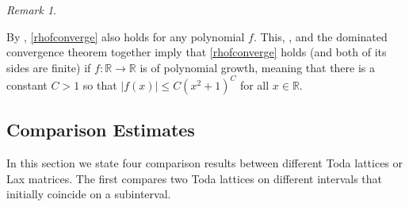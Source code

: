 \documentclass{amsart}
\numberwithin{equation}{section}
\theoremstyle{remark}
\newtheorem{rem}[thm]{Remark}
\theoremstyle{definition}
\begin{document}
	\begin{rem} 
		
		\label{fcn} 
		
		By \cite[Corollary 3.2]{DSME}, \eqref{rhofconverge} also holds for any polynomial $f$. This, , and the dominated convergence theorem together imply that \eqref{rhofconverge} holds (and both of its sides are finite) if $f : \mathbb{R} \rightarrow \mathbb{R}$ is of polynomial growth, meaning that there is a constant $C > 1$ so that $|f(x)| \le C (x^2+1)^C$ for all $x \in \mathbb{R}$.
	\end{rem} 
	
	


	\subsection{Comparison Estimates}

	\label{LCompare} 	
	
	In this section we state four comparison results between different Toda lattices or Lax matrices. The first compares two Toda lattices on different intervals that initially coincide on a subinterval. 
	
\end{document}
